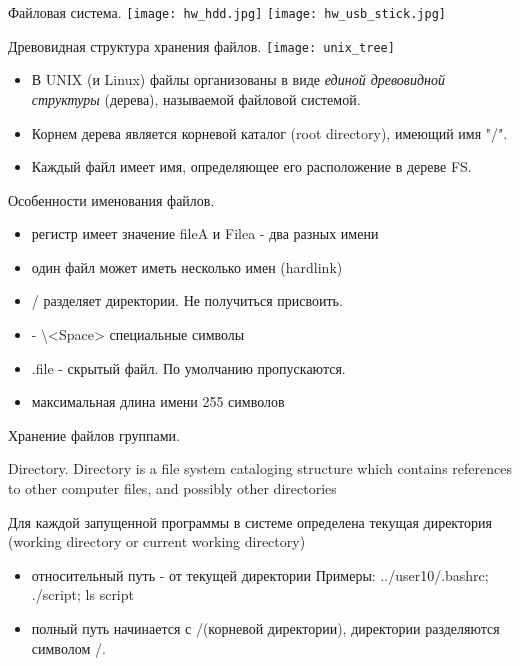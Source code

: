 \begin{frame}{Файловая система.}
\texttt{[image: hw\_hdd.jpg]} 
\texttt{[image: hw\_usb\_stick.jpg]} 
\end{frame}

\begin{frame}{Древовидная структура хранения файлов.}
\texttt{[image: unix\_tree]} 
  \begin{itemize}
    \item В UNIX (и Linux) файлы организованы в виде \emph{единой древовидной структуры} (дерева), называемой \alert{файловой системой}.
    \item Корнем дерева является \alert{корневой каталог} (root directory), имеющий имя \alert{"/"}.
    \item Каждый файл имеет \alert{имя}, определяющее его расположение в дереве FS.
  \end{itemize}
\end{frame}


\begin{frame}[fragile]{Особенности именования файлов.}

                \begin{itemize}
                    \item регистр имеет значение \alert{fileA} и \alert{Filea} - два разных имени
                    \item один файл может иметь \alert{несколько} имен (hardlink) 
                    \item \alert{/} разделяет директории. Не получиться присвоить.
                    \item \alert{- \textbackslash <Space>} специальные символы 
                    \item \alert{.}file - скрытый файл. По умолчанию пропускаются.
                    \item максимальная длина имени \alert{255} символов
                \end{itemize}
\end{frame}

\begin{frame}[fragile]{Хранение файлов группами.}
      \begin{block}{Directory.}
Directory is a file system cataloging structure which contains references to other computer \alert{files}, and possibly other \alert{directories}
      \end{block}
 Для каждой запущенной программы в системе определена \alert{текущая директория} (working directory or current working directory) 
  \begin{itemize}
    \item \alert{относительный путь} - от текущей директории \newline
      Примеры: ../user10/.bashrc; ./script; ls script
    \item \alert{полный путь} начинается с \alert{/}(корневой директории), директории разделяются символом \alert{/}. \newline
  \end{itemize}
\end{frame}

